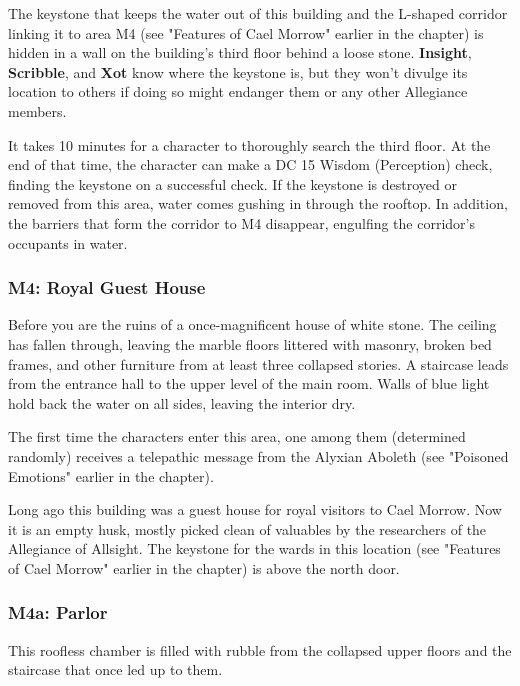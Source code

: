 \documentclass[letterpaper, 11pt, bg=full, twocolumn]{dndbook}
\begin{document}
The keystone that keeps the water out of this building and the L-shaped corridor linking it to area M4 (see "Features of Cael Morrow" earlier in the chapter) is hidden in a wall on the building's third floor behind a loose stone. \textbf{Insight}, \textbf{Scribble}, and \textbf{Xot} know where the keystone is, but they won't divulge its location to others if doing so might endanger them or any other Allegiance members.

It takes 10 minutes for a character to thoroughly search the third floor. At the end of that time, the character can make a DC 15 Wisdom (Perception) check, finding the keystone on a successful check. If the keystone is destroyed or removed from this area, water comes gushing in through the rooftop. In addition, the barriers that form the corridor to M4 disappear, engulfing the corridor's occupants in water.

\subsubsection{M4: Royal Guest House}

\begin{DndReadAloud}
Before you are the ruins of a once-magnificent house of white stone. The ceiling has fallen through, leaving the marble floors littered with masonry, broken bed frames, and other furniture from at least three collapsed stories. A staircase leads from the entrance hall to the upper level of the main room. Walls of blue light hold back the water on all sides, leaving the interior dry.
\end{DndReadAloud}

The first time the characters enter this area, one among them (determined randomly) receives a telepathic message from the Alyxian Aboleth (see "Poisoned Emotions" earlier in the chapter).

Long ago this building was a guest house for royal visitors to Cael Morrow. Now it is an empty husk, mostly picked clean of valuables by the researchers of the Allegiance of Allsight. The keystone for the wards in this location (see "Features of Cael Morrow" earlier in the chapter) is above the north door.

\subsubsection{M4a: Parlor}

This roofless chamber is filled with rubble from the collapsed upper floors and the staircase that once led up to them.
\end{document}
